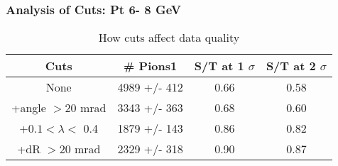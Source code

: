 \frame
{
\frametitle{Analysis of Cuts: Pt  6- 8 GeV}
\begin{table}
\caption{How cuts affect data quality}
\centering
\begin{tabular}{c c c c}
\hline\hline
Cuts & \# Pions1 & S/T at 1 $\sigma$ & S/T at 2 $\sigma$ \\ [0.5ex]
\hline
None & 4989 +/-  412 & 0.66 & 0.58 \\ %
+angle $> 20$ mrad & 3343 +/-  363 & 0.68 & 0.60 \\ %
+$0.1 < \lambda <$ 0.4 & 1879 +/-  143 & 0.86 & 0.82 \\ %
+dR $> 20$ mrad & 2329 +/-  318 & 0.90 & 0.87 \\ %
[1ex]
\hline
\end{tabular}
\label{table:nonlin}
\end{table}
}
